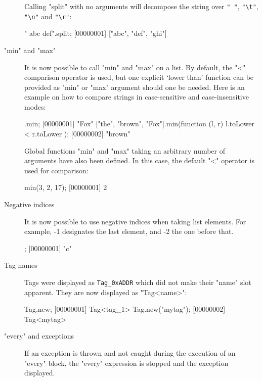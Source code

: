 \begin{description}
Calling "split" with no arguments will decompose the string over
\lstinline|" "|, \lstinline|"\t"|, \lstinline|"\n"| and
\lstinline|"\r"|:

\begin{urbiscript}
"  abc  def\tghi\n".split;
[00000001] ["abc", "def", "ghi"]
\end{urbiscript}

\item["min" and "max"]

It is now possible to call "min" and "max" on a list. By default, the
"<" comparison operator is used, but one explicit `lower than'
function can be provided as "min" or "max" argument should one be
needed. Here is an example on how to compare strings in case-sensitive
and case-insensitive modes:

\begin{urbiscript}
.min;
[00000001] "Fox"
["the", "brown", "Fox"].min(function (l, r) { l.toLower < r.toLower });
[00000002] "brown"
\end{urbiscript}

Global functions "min" and "max" taking an arbitrary number of
arguments have also been defined. In this case, the default "<"
operator is used for comparison:

\begin{urbiscript}
min(3, 2, 17);
[00000001] 2
\end{urbiscript}

\item[Negative indices]

It is now possible to use negative indices when taking list elements.
For example, -1 designates the last element, and -2 the one before that.

\begin{urbiscript}
["a", "b", "c"][-1];
[00000001] "c"
\end{urbiscript}

\item[Tag names]

  Tags were displayed as \lstinline|Tag_0xADDR| which did not make
  their "name" slot apparent. They are now displayed as "Tag<name>":

\begin{urbiscript}
Tag.new;
[00000001] Tag<tag_1>
Tag.new("mytag");
[00000002] Tag<mytag>
\end{urbiscript}

\item["every" and exceptions]

If an exception is thrown and not caught during the execution of an "every"
block, the "every" expression is stopped and the exception displayed.
\end{description}

